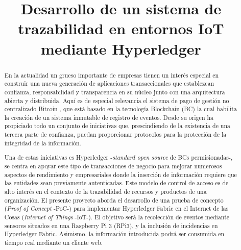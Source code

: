 \documentclass[10pt,conference,a4paper]{IEEEtran}
\begin{document}
\title{Desarrollo de un sistema de trazabilidad en entornos IoT mediante Hyperledger}

\author{
\and
{}
}

\maketitle

\begin{abstract}
    En la actualidad un grueso importante de empresas tienen un
    interés especial en construir una nueva generación de aplicaciones
    transaccionales que establezcan confianza, responsabilidad y
    transparencia en su núcleo junto con una arquitectura abierta y
    distribuida. Aquí es de especial relevancia el sistema de pago de
    gestión no centralizado Bitcoin \cite{franco:2014:UB}, que está basado
    en la tecnología Blockchain (BC) la cual habilita la creación de un
    sistema inmutable de registro de eventos. Desde su origen ha
    propiciado todo un conjunto de iniciativas que, prescindiendo de la
    existencia de una tercera parte de confianza, puedan
    proporcionar protocolos para la protección de la integridad de la
    información.

    Una de estas iniciativas es Hyperledger \cite{hyperledger:url}
    -\textit{standard open source} de BCs permisionadas-, se centra en apoyar
    este tipo de transacciones de negocio para mejorar numerosos
    aspectos de rendimiento y empresariales donde la inserción de
    información requiere que las entidades sean previamente
    autenticadas. Este modelo de control de acceso es de alto interés
    en el contexto de la trazabilidad de recursos y productos de una
    organización. El presente proyecto aborda el desarrollo de una
    prueba de concepto (\textit{Proof of Concept} -PoC-) para implementar Hyperledger Fabric \cite{hyperledgerfabric:url} en el Internet de
    las Cosas (\emph{Internet of Things} -IoT-). El objetivo será la recolección de eventos mediante sensores situados en una Raspberry Pi 3 (RPi3), y la inclusión de
    incidencias en Hyperledger Fabric. Asimismo, la información introducida
    podrá ser consumida en tiempo real mediante un cliente web.
    
\end{abstract}
\end{document}
